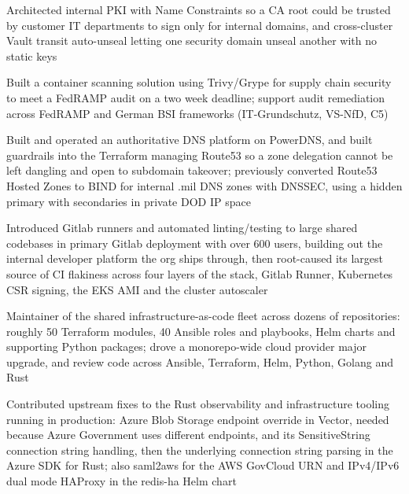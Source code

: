 \documentclass{resume}
\begin{document}
\begin{resumeItems}
\item Architected internal PKI with Name Constraints so a CA root could be trusted by customer IT departments to sign only for internal domains, and cross-cluster Vault transit auto-unseal letting one security domain unseal another with no static keys
\item Built a container scanning solution using Trivy/Grype for supply chain security to meet a FedRAMP audit on a two week deadline; support audit remediation across FedRAMP and German BSI frameworks (IT-Grundschutz, VS-NfD, C5)
\item Built and operated an authoritative DNS platform on PowerDNS, and built guardrails into the Terraform managing Route53 so a zone delegation cannot be left dangling and open to subdomain takeover; previously converted Route53 Hosted Zones to BIND for internal .mil DNS zones with DNSSEC, using a hidden primary with secondaries in private DOD IP space
\item Introduced Gitlab runners and automated linting/testing to large shared codebases in primary Gitlab deployment with over 600 users, building out the internal developer platform the org ships through, then root-caused its largest source of CI flakiness across four layers of the stack, Gitlab Runner, Kubernetes CSR signing, the EKS AMI and the cluster autoscaler
\item Maintainer of the shared infrastructure-as-code fleet across dozens of repositories: roughly 50 Terraform modules, 40 Ansible roles and playbooks, Helm charts and supporting Python packages; drove a monorepo-wide cloud provider major upgrade, and review code across Ansible, Terraform, Helm, Python, Golang and Rust
\item Contributed upstream fixes to the Rust observability and infrastructure tooling running in production: Azure Blob Storage endpoint override in Vector, needed because Azure Government uses different endpoints, and its SensitiveString connection string handling, then the underlying connection string parsing in the Azure SDK for Rust; also saml2aws for the AWS GovCloud URN and IPv4/IPv6 dual mode HAProxy in the redis-ha Helm chart
\end{resumeItems}
\end{document}
